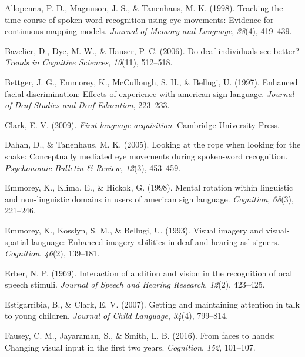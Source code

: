 \documentclass[,man,floatsintext]{apa6}
\begin{document}
\setlength{\parindent}{-0.5in}
\setlength{\leftskip}{0.5in}

\hypertarget{refs}{}
\leavevmode\hypertarget{ref-allopenna1998tracking}{}%
Allopenna, P. D., Magnuson, J. S., \& Tanenhaus, M. K. (1998). Tracking the time course of spoken word recognition using eye movements: Evidence for continuous mapping models. \emph{Journal of Memory and Language}, \emph{38}(4), 419--439.

\leavevmode\hypertarget{ref-bavelier2006deaf}{}%
Bavelier, D., Dye, M. W., \& Hauser, P. C. (2006). Do deaf individuals see better? \emph{Trends in Cognitive Sciences}, \emph{10}(11), 512--518.

\leavevmode\hypertarget{ref-bettger1997enhanced}{}%
Bettger, J. G., Emmorey, K., McCullough, S. H., \& Bellugi, U. (1997). Enhanced facial discrimination: Effects of experience with american sign language. \emph{Journal of Deaf Studies and Deaf Education}, 223--233.

\leavevmode\hypertarget{ref-clark2009first}{}%
Clark, E. V. (2009). \emph{First language acquisition}. Cambridge University Press.

\leavevmode\hypertarget{ref-dahan2005looking}{}%
Dahan, D., \& Tanenhaus, M. K. (2005). Looking at the rope when looking for the snake: Conceptually mediated eye movements during spoken-word recognition. \emph{Psychonomic Bulletin \& Review}, \emph{12}(3), 453--459.

\leavevmode\hypertarget{ref-emmorey1998mental}{}%
Emmorey, K., Klima, E., \& Hickok, G. (1998). Mental rotation within linguistic and non-linguistic domains in users of american sign language. \emph{Cognition}, \emph{68}(3), 221--246.

\leavevmode\hypertarget{ref-emmorey1993visual}{}%
Emmorey, K., Kosslyn, S. M., \& Bellugi, U. (1993). Visual imagery and visual-spatial language: Enhanced imagery abilities in deaf and hearing asl signers. \emph{Cognition}, \emph{46}(2), 139--181.

\leavevmode\hypertarget{ref-erber1969interaction}{}%
Erber, N. P. (1969). Interaction of audition and vision in the recognition of oral speech stimuli. \emph{Journal of Speech and Hearing Research}, \emph{12}(2), 423--425.

\leavevmode\hypertarget{ref-estigarribia2007getting}{}%
Estigarribia, B., \& Clark, E. V. (2007). Getting and maintaining attention in talk to young children. \emph{Journal of Child Language}, \emph{34}(4), 799--814.

\leavevmode\hypertarget{ref-fausey2016faces}{}%
Fausey, C. M., Jayaraman, S., \& Smith, L. B. (2016). From faces to hands: Changing visual input in the first two years. \emph{Cognition}, \emph{152}, 101--107.
\end{document}
